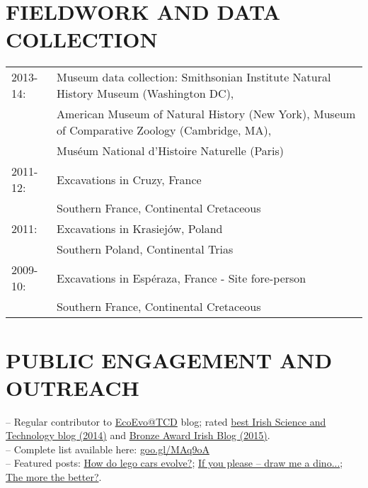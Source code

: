 \documentclass[10pt,a4paper]{article}
\begin{document}
{\section{FIELDWORK AND DATA COLLECTION}

\begin{tabular}{ll}
2013-14: & Museum data collection: Smithsonian Institute Natural History Museum (Washington DC),\\
 & American Museum of Natural History (New York), Museum of Comparative Zoology (Cambridge, MA),\\
 & Mus\'{e}um National d'Histoire Naturelle (Paris) \\
2011-12: & Excavations in Cruzy, France \\
         & Southern France, Continental Cretaceous\\
2011: & Excavations in Krasiej\'{o}w, Poland\\
      & Southern Poland, Continental Trias\\
2009-10: & Excavations in Esp\'{e}raza, France - Site fore-person\\
         & Southern France, Continental Cretaceous\\
\end{tabular}
\bigskip

\section{PUBLIC ENGAGEMENT AND OUTREACH}
-- Regular contributor to \href{http://www.ecoevoblog.com/}{EcoEvo@TCD} blog; rated \href{http://www.ecoevoblog.com/2014/10/06/blog-awards-winners-2014/}{best Irish Science and Technology blog (2014)} and \href{http://www.blogawardsireland.com/wp-content/uploads/2015/09/Blog-Awards-Ireland-2015-Finalists-Company.pdf}{Bronze Award Irish Blog (2015)}. \\
-- Complete list available here: \href{http://tguillerme.github.io/outreach.html}{goo.gl/MAq9oA}\\
-- Featured posts: \href{http://www.ecoevoblog.com/2013/11/04/how-do-lego-cars-evolve/}{How do lego cars evolve?}; \href{http://www.ecoevoblog.com/2013/06/04/if-you-please-draw-me-a-dino/}{If you please -- draw me a dino...}; \href{http://www.ecoevoblog.com/2015/02/06/the-more-the-better/}{The more the better?}.

}
\end{document}
